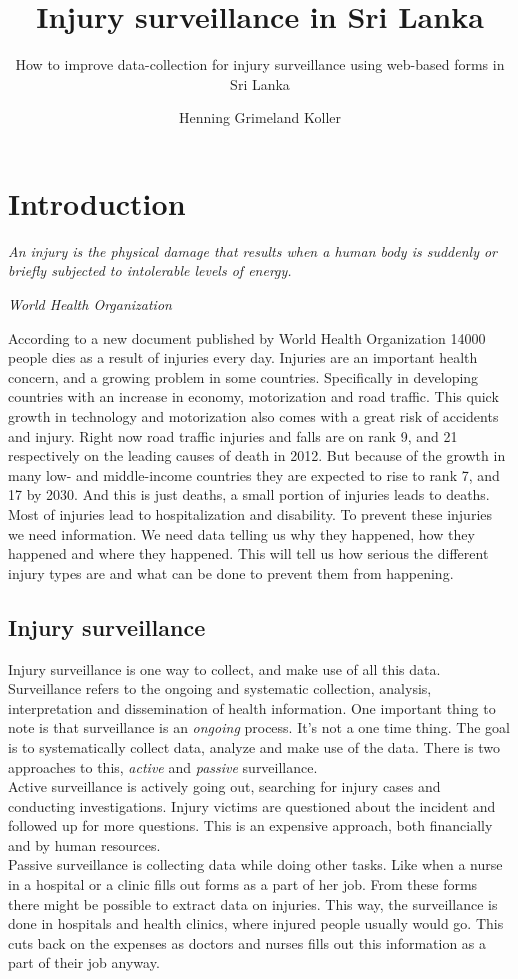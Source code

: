\documentclass[UKenglish, 12pt]{article}
\title{Injury surveillance in Sri Lanka}
\subtitle{How to improve data-collection for injury surveillance
using web-based forms in Sri Lanka}
\author{Henning Grimeland Koller}
\newcommand{\WHO}{World Health Organization }
\begin{document}
\ififorside{}
\newpage

\section*{Introduction} 
\epigraph{ \textit{An injury is the physical damage that
results when a human body is suddenly or briefly subjected to intolerable
levels of energy.}}{\textit{\WHO\cite{who-guide}}}

According to a new document published by \WHO\cite{who-article} 14000 people
dies as a result of injuries every day.  Injuries are an important health
concern, and a growing problem in some countries. Specifically in developing
countries with an increase in economy, motorization and road traffic.  This
quick growth in technology and motorization also comes with a great risk of
accidents and injury.  Right now road traffic injuries and falls are on rank 9,
and 21 respectively on the leading causes of death in
2012.\cite[4]{who-article} But because of the growth in many low- and
middle-income countries they are expected to rise to rank 7, and 17 by 2030.
And this is just deaths, a small portion of injuries leads to deaths. Most of
injuries lead to hospitalization and disability.  To prevent these injuries we
need information. We need data telling us why they happened, how they happened
and where they happened.  This will tell us how serious the different injury
types are and what can be done to prevent them from happening.

\subsection*{Injury surveillance}
Injury surveillance is one way to collect, and
make use of all this data.  Surveillance refers to the ongoing and systematic
collection, analysis, interpretation and dissemination of health
information.\cite[11]{who-guide} One important thing to note is that
surveillance is an \textit{ongoing} process.  It's not a one time thing. The
goal is to systematically collect data, analyze and make use of the
data.  There is two approaches to this, \textit{active} and \textit{passive}
surveillance. \\Active surveillance is actively going out, searching for injury
cases and conducting investigations.  Injury victims are questioned about the
incident and followed up for more questions. This is an expensive approach,
both financially and by human resources. \\Passive surveillance is collecting
data while doing other tasks.  Like when a nurse in a hospital or a clinic
fills out forms as a part of her job. From these forms there might be possible
to extract data on injuries. This way, the surveillance is done in hospitals and
health clinics, where injured people usually would go.  This cuts back on the
expenses as doctors and nurses fills out this information as a part of their job
anyway.\\
\end{document}
